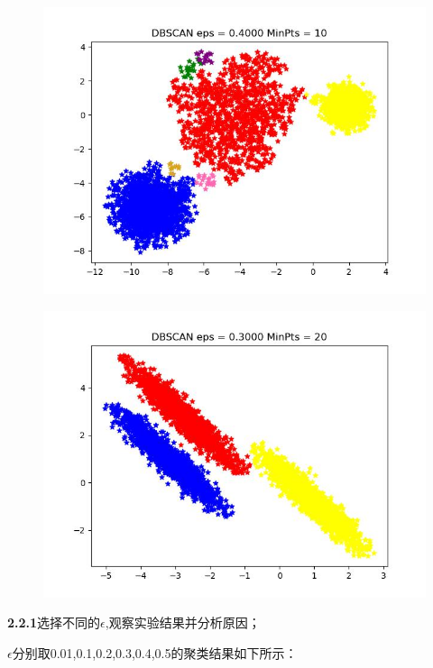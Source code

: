 \documentclass[UTF8]{ctexart}
\begin{document}
\begin{figure}[H]
  \centering
  \includegraphics[scale=0.46]{data2.jpg}
\end{figure}

\begin{figure}[H]
  \centering
  \includegraphics[scale=0.46]{data3.jpg}
\end{figure}

\noindent \textbf{}

\noindent \textbf{2.2.1}选择不同的$\epsilon$,观察实验结果并分析原因；

$\epsilon$分别取0.01,0.1,0.2,0.3,0.4,0.5的聚类结果如下所示：
\end{document}
